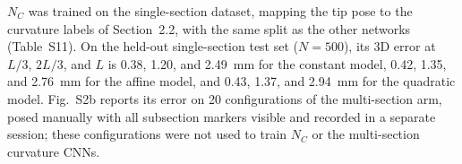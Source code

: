 $N_C$ was trained on the single-section dataset, mapping the tip pose to the curvature labels of Section~2.2, with the same split as the other networks (Table~S11). On the held-out single-section test set ($N = 500$), its 3D error at $L/3$, $2L/3$, and $L$ is 0.38, 1.20, and 2.49~mm for the constant model, 0.42, 1.35, and 2.76~mm for the affine model, and 0.43, 1.37, and 2.94~mm for the quadratic model. Fig.~S2b reports its error on 20 configurations of the multi-section arm, posed manually with all subsection markers visible and recorded in a separate session; these configurations were not used to train $N_C$ or the multi-section curvature CNNs.
